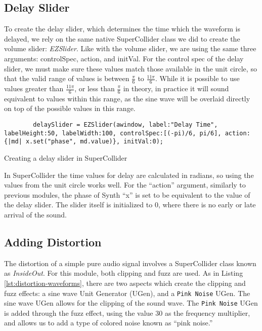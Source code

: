 \subsection{Delay Slider}

To create the delay slider, which determines the time which the waveform is delayed, we rely on the same native SuperCollider class we did to create the volume slider: \textit{EZSlider}. Like with the volume slider, we are using the same three arguments: controlSpec, action, and initVal. For the control spec of the delay slider, we must make sure these values match those available in the unit circle, so that the valid range of values is between $\frac{\pi}{6}$ to $\frac{11\pi}{6}$. While it is possible to use values greater than $\frac{11\pi}{6}$, or less than $\frac{\pi}{6}$ in theory, in practice it will sound equivalent to values within this range, as the sine wave will be overlaid directly on top of the possible values in this range. 

\begin{listing}
	\begin{lstlisting}
		delaySlider = EZSlider(awindow, label:"Delay Time", labelHeight:50, labelWidth:100, controlSpec:[(-pi)/6, pi/6], action: {|md| x.set("phase", md.value)}, initVal:0);	
	\end{lstlisting}
	\caption{Creating a delay slider in SuperCollider}
	\label{lst:delay-slider}
\end{listing}

In SuperCollider the time values for delay are calculated in radians, so using the values from the unit circle works well. For the ``action'' argument, similarly to previous modules, the phase of Synth ``x'' is set to be equivalent to the value of the delay slider. The slider itself is initialized to 0, where there is no early or late arrival of the sound.

\subsection{Adding Distortion}

The distortion of a simple pure audio signal involves a SuperCollider class known as \textit{InsideOut}. For this module, both clipping and fuzz are used. As in Listing \ref{lst:distortion-waveforms}, there are two aspects which create the clipping and fuzz effects: a sine wave Unit Generator (UGen), and a \texttt{Pink Noise} UGen. The sine wave UGen allows for the clipping of the sound wave. The \texttt{Pink Noise} UGen is added through the fuzz effect, using the value 30 as the frequency multiplier, and allows us to add a type of colored noise known as ``pink noise.''

